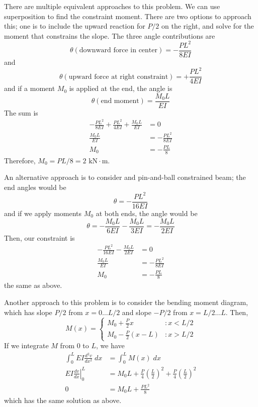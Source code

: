 \begin{solution}
There are multiple equivalent approaches to this problem. We can use superposition to find the constraint moment. There are two options to approach this; one is to include the upward reaction for $P/2$ on the right, and solve for the moment that constrains the slope. The three angle contributions are
\[
\theta(\text{downward force in center}) = -\frac{PL^2}{8EI}
\]
and
\[
\theta(\text{upward force at right constraint}) = +\frac{PL^2}{4EI}
\]
and if a moment $M_0$ is applied at the end, the angle is
\[
\theta(\text{end moment}) = \frac{M_0L}{EI}
\]
The sum is
\[
\begin{split}
-\frac{PL^2}{8EI} + \frac{PL^2}{4EI} + \frac{M_0L}{EI} &= 0\\
\frac{M_0L}{EI} &= -\frac{PL^2}{8EI}\\
M_0 &= -\frac{PL}{8}
\end{split}
\]
Therefore, $M_0 = PL/8 = 2\text{ kN}\cdot\text{m}$.

An alternative approach is to consider and pin-and-ball constrained beam; the end angles would be
\[
\theta = -\frac{PL^2}{16EI}
\]
and if we apply moments $M_0$ at both ends, the angle would be
\[
\theta = -\frac{M_0L}{6EI} - \frac{M_0L}{3EI} = -\frac{M_0L}{2EI}
\]
Then, our constraint is
\[
\begin{split}
-\frac{PL^2}{16EI} - \frac{M_0L}{2EI} &= 0\\
\frac{M_0L}{EI} &= -\frac{PL^2}{8EI}\\
M_0 &= -\frac{PL}{8}
\end{split}
\]
the same as above.

Another approach to this problem is to consider the bending moment diagram, which has slope $P/2$ from $x=0\ldots L/2$ and slope $-P/2$ from $x=L/2\ldots L$. Then,
\[
M(x)=
\begin{cases}
M_0 +\frac{P}{2}x &: x<L/2\\
M_0 -\frac{P}{2}(x-L) &: x>L/2
\end{cases}
\]
If we integrate $M$ from 0 to $L$, we have
\[
\begin{split}
\int_0^L EI\frac{d^2v}{dx^2}\; dx &= \int_0^L M(x)\;dx\\
EI\left.\frac{dv}{dx}\right|_0^L &= M_0 L +\frac{P}{4}\left(\frac{L}{2}\right)^2 +\frac{P}{4}\left(\frac{L}{2}\right)^2\\
0 &= M_0L + \frac{PL^2}{8}
\end{split}
\]
which has the same solution as above.
\end{solution}

